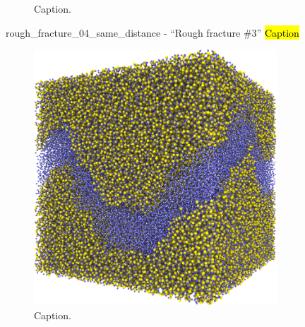 \begin{figure}[htpb]
\begin{subfigure}[b]{\myfigwidth}
        \caption{Caption.}%
    \end{subfigure}%
    \caption{%
        rough\_fracture\_04\_same\_distance - ``Rough fracture \#3'' \hl{Caption} %
        \label{fig:renderings_rough_fracture04_same_distance}%
    }%
\end{figure}%

%
\begin{figure}[htpb]%
    \centering%
    \setlength{\myfigwidth}{0.49\textwidth}%
%
    \begin{subfigure}[b]{\myfigwidth}%
        \centering%
        \includegraphics[width=\textwidth]{images/systems/trimmed-rough_fracture05_05}%
        \caption{Caption.}%
    \end{subfigure}%
    \hfill%
    \begin{subfigure}[b]{\myfigwidth}%
        \centering%

\end{subfigure}
\end{figure}
